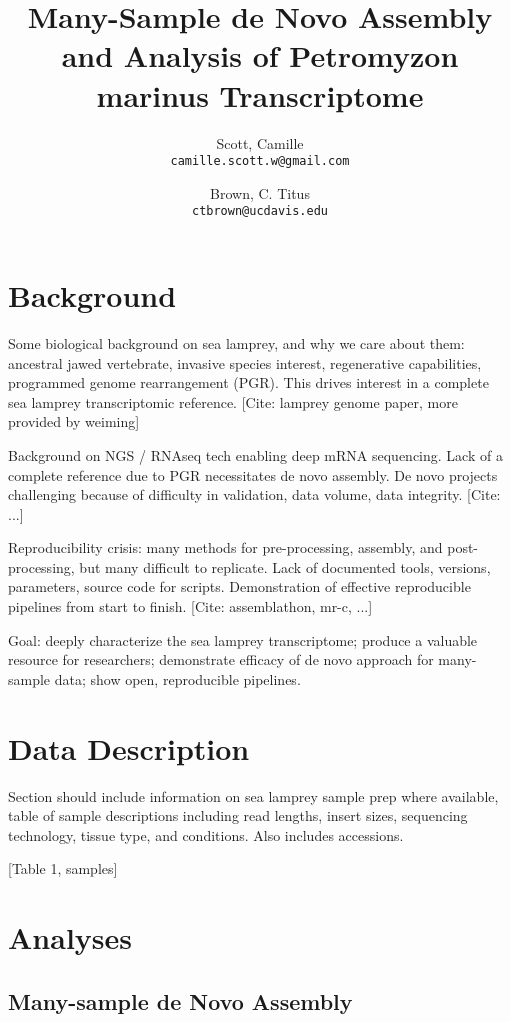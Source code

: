 \documentclass{article}
\title{Many-Sample de Novo Assembly and Analysis of Petromyzon marinus Transcriptome}
\author{
    Scott, Camille\\
    \texttt{camille.scott.w@gmail.com}   %
    \and
    Brown, C. Titus\\
    \texttt{ctbrown@ucdavis.edu}
}
\begin{document}
\maketitle

\section*{Background}

Some biological background on sea lamprey, and why we care about them: ancestral jawed vertebrate, 
invasive species interest, regenerative capabilities, programmed genome rearrangement (PGR). This 
drives interest in a complete sea lamprey transcriptomic reference. [Cite: lamprey genome paper, 
more provided by weiming]

Background on NGS / RNAseq tech enabling deep mRNA sequencing. Lack of a complete reference due 
to PGR necessitates de novo assembly. De novo projects challenging because of difficulty in 
validation, data volume, data integrity. [Cite: ...]

Reproducibility crisis: many methods for pre-processing, assembly, and post-processing, but many 
difficult to replicate. Lack of documented tools, versions, parameters, source code for scripts. 
Demonstration of effective reproducible pipelines from start to finish. [Cite: assemblathon, mr-c, ...]

Goal: deeply characterize the sea lamprey transcriptome; produce a valuable resource for researchers; 
demonstrate efficacy of de novo approach for many-sample data; show open, reproducible pipelines.

\section*{Data Description}

Section should include information on sea lamprey sample prep where available, table of sample 
descriptions including read lengths, insert sizes, sequencing technology, tissue type, and conditions. 
Also includes accessions.

[Table 1, samples]

\section*{Analyses}

\subsection*{Many-sample de Novo Assembly}
\end{document}
